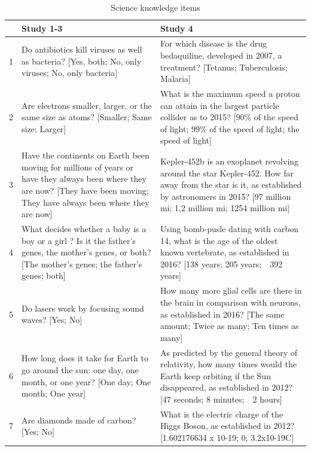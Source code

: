 \documentclass[
  doc,floatsintext]{apa6}
\begin{document}
\begin{table}[tbp]

\begin{center}
\begin{threeparttable}

\caption{\label{tab:knowledge}Science knowledge items}

\begin{tabular}{m{0.5cm}m{8cm}m{8cm}}
\toprule
 & Study 1-3 & Study 4\\
\midrule
1 & Do antibiotics kill viruses as well as bacteria? [Yes, both; No, only viruses; No, only bacteria] & For which disease is the drug bedaquiline, developed in 2007, a treatment? [Tetanus; Tuberculosis; Malaria]\\
2 & Are electrons smaller, larger, or the same size as atoms? [Smaller; Same size; Larger] & What is the maximum speed a proton can attain in the largest particle collider as to 2015? [90\% of the speed of light; 99\% of the speed of light; the speed of light]\\
3 & Have the continents on Earth been moving for millions of years or have they always been where they are now? [They have been moving; They have always been where they are now] & Kepler-452b is an exoplanet revolving around the star Kepler-452. How far away from the star is it, as established by astronomers in 2015? [97 million mi; 1,2 million mi; 1254 million mi]\\
4 & What decides whether a baby is a boy or a girl ? Is it the father's genes, the mother's genes, or both? [The mother's genes; the father's genes; both] & Using bomb-pusle dating with carbon 14, what is the age of the oldest known vertebrate, as established in 2016? [138 years; 205 years;\ \ 392 years]\\
5 & Do lasers work by focusing sound waves? [Yes; No] & How many more glial cells are there in the brain in comparison with neurons, as established in 2016? [The same amount; Twice as many; Ten times as many]\\
6 & How long does it take for Earth to go around the sun: one day, one month, or one year? [One day; One month; One year] & As predicted by the general theory of relativity, how many times would the Earth keep orbiting if the Sun disappeared, as established in 2012? [47 seconds; 8 minutes;\ \ 2 hours]\\
7 & Are diamonds made of carbon? [Yes; No] & What is the electric charge of the Higgs Boson, as established in 2012? [1.602176634 x 10-19; 0; 3.2x10-19C]\\

\end{tabular}
\end{threeparttable}
\end{center}
\end{table}
\end{document}
